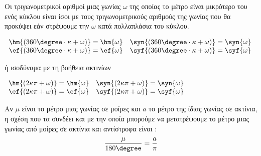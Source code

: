 Οι τριγωνομετρικοί αριθμοί μιας γωνίας $ \omega $ της οποίας το μέτρο είναι μικρότερο του ενός κύκλου είναι ίσοι με τους τριγωνομετρικούς αριθμούς της γωνίας που θα προκύψει εάν στρέψουμε την $ \omega $ κατά πολλαπλάσια του κύκλου.
\begin{center}
$ \begin{array}{cc}
\hm{\left( 360\degree\cdot \kappa+\omega\right) }=\hm{\omega} & \syn{\left( 360\degree\cdot \kappa+\omega\right) }=\syn{\omega} \\ 
\ef{\left( 360\degree\cdot \kappa+\omega\right) }=\ef{\omega} & \syf{\left( 360\degree\cdot \kappa+\omega\right) }=\syf{\omega}
\end{array} $
\end{center}
ή ισοδύναμα με τη βοήθεια ακτινίων
\begin{center}
$ \begin{array}{cc}
\hm{\left( 2\kappa\pi+\omega\right) }=\hm{\omega} & \syn{\left( 2\kappa\pi+\omega\right) }=\syn{\omega} \\ 
\ef{\left( 2\kappa\pi+\omega\right) }=\ef{\omega} & \syf{\left( 2\kappa\pi+\omega\right) }=\syf{\omega}
\end{array} $
\end{center}
Αν $ \mu $ είναι το μέτρο μιας γωνίας σε μοίρες και $ a $ το μέτρο της ίδιας γωνίας σε ακτίνια, η σχέση που τα συνδέει και με την οποία μπορούμε να μετατρέψουμε το μέτρο μιας γωνίας από μοίρες σε ακτίνια και αντίστροφα είναι :
\[ \frac{\mu}{180\degree}=\frac{a}{\pi} \]
\newpage
\noindent
\Alyta
